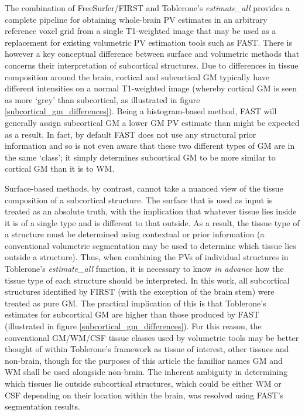 \documentclass[12pt]{report}
\begin{document}
The combination of FreeSurfer/FIRST and Toblerone's \textit{estimate\_all} provides a complete pipeline for obtaining whole-brain PV estimates in an arbitrary reference voxel grid from a single T1-weighted image that may be used as a replacement for existing volumetric PV estimation tools such as FAST. There is however a key conceptual difference between surface and volumetric methods that concerns their interpretation of subcortical structures. Due to differences in tissue composition around the brain, cortical and subcortical GM typically have different intensities on a normal T1-weighted image (whereby cortical GM is seen as more ‘grey’ than subcortical, as illustrated in figure \ref{subcortical_gm_differences}). Being a histogram-based method, FAST will generally assign subcortical GM a lower GM PV estimate than might be expected as a result. In fact, by default FAST does not use any structural prior information and so is not even aware that these two different types of GM are in the same `class'; it simply determines subcortical GM to be more similar to cortical GM than it is to WM. 

Surface-based methods, by contrast, cannot take a nuanced view of the tissue composition of a subcortical structure. The surface that is used as input is treated as an absolute truth, with the implication that whatever tissue lies inside it is of a single type and is different to that outside. As a result, the tissue type of a structure must be determined using contextual or prior information (a conventional volumetric segmentation may be used to determine which tissue lies outside a structure). Thus, when combining the PVs of individual structures in Toblerone’s \textit{estimate\_all} function, it is necessary to know \textit{in advance} how the tissue type of each structure should be interpreted. In this work, all subcortical structures identified by FIRST (with the exception of the brain stem) were treated as pure GM. The practical implication of this is that Toblerone’s estimates for subcortical GM are higher than those produced by FAST (illustrated in figure \ref{subcortical_gm_differences}). For this reason, the conventional GM/WM/CSF tissue classes used by volumetric tools may be better thought of within Toblerone’s framework as tissue of interest, other tissues and non-brain, though for the purposes of this article the familiar names GM and WM shall be used alongside non-brain. The inherent ambiguity in determining which tissues lie outside subcortical structures, which could be either WM or CSF depending on their location within the brain, was resolved using FAST’s segmentation results.
\end{document}
